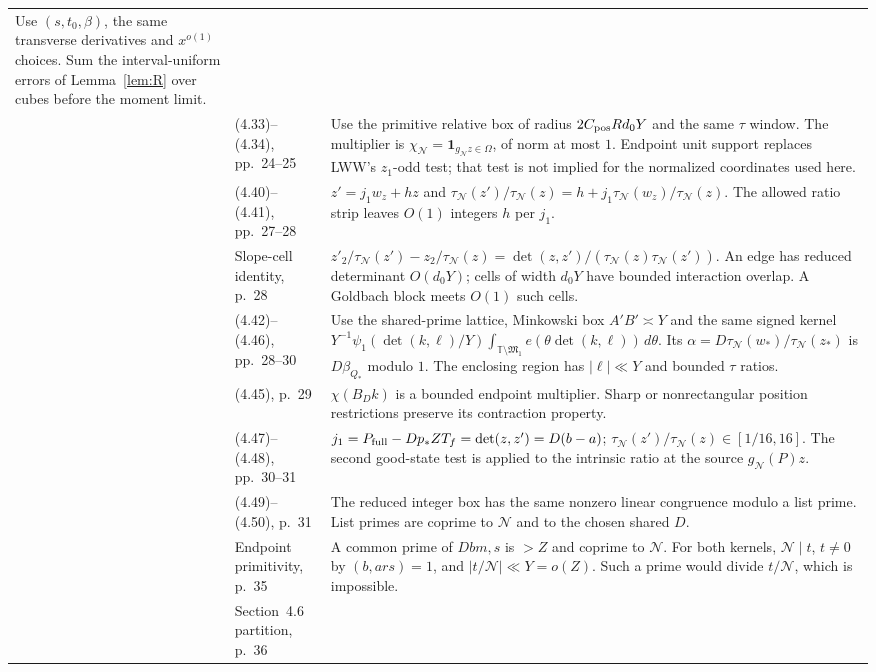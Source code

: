 \documentclass[11pt]{article}
\theoremstyle{definition}
\newcommand{\ind}{\mathbf 1}
\newcommand{\GN}{\mathcal N}
\newcommand{\T}{\mathbb T}
\newcommand{\tauN}{\tau_{\GN}}
\newcommand{\gN}{g_{\GN}}
\newcommand{\Mone}{\mathfrak M_1}
\theoremstyle{remark}
\numberwithin{equation}{section}
\begin{document}
\begin{longtable}{@{}>{\raggedright\arraybackslash}p{}>{\raggedright\arraybackslash}p{}>{\raggedright\arraybackslash}p{}@{}}
Use $(s,t_0,\beta)$, the same transverse derivatives and
$x^{o(1)}$ choices. Sum the interval-uniform errors of Lemma~\ref{lem:R}
over cubes before the moment limit.\\
9\label{dict:09}&(4.33)--(4.34), pp.~24--25&
Use the primitive relative box of radius $2C_{\rm pos}Rd_0Y$
and the same $\tau$ window. The multiplier is
$\chi_{\GN}=\ind_{\gN z\in\Omega}$, of norm at most $1$.
Endpoint unit support replaces LWW's $z_1$-odd test;
that test is not implied for the normalized coordinates used here.\\
10\label{dict:10}&(4.40)--(4.41), pp.~27--28&
$z'=j_1w_z+hz$ and
$\tauN(z')/\tauN(z)=h+j_1\tauN(w_z)/\tauN(z)$.
The allowed ratio strip leaves $O(1)$ integers $h$ per $j_1$.\\
11\label{dict:11}&Slope-cell identity, p.~28&
$z'_2/\tauN(z')-z_2/\tauN(z)=\det(z,z')/(\tauN(z)\tauN(z'))$.
An edge has reduced determinant $O(d_0Y)$; cells of width $d_0Y$
have bounded interaction overlap. A Goldbach block meets $O(1)$ such cells.\\
12\label{dict:12}&(4.42)--(4.46), pp.~28--30&
Use the shared-prime lattice, Minkowski box $A'B'\asymp Y$ and
the same signed kernel
$Y^{-1}\psi_1(\det(k,\ell)/Y)\int_{\T\setminus\Mone}e(\theta\det(k,\ell))\,d\theta$.
Its $\alpha=D\tauN(w_*)/\tauN(z_*)$ is $D\beta_{Q_*}$ modulo $1$.
The enclosing region has $|\ell|\ll Y$ and bounded $\tau$ ratios.\\
13\label{dict:13}&(4.45), p.~29&
$\chi(B_Dk)$ is a bounded endpoint multiplier. Sharp or nonrectangular
position restrictions preserve its contraction property.\\
14\label{dict:14}&(4.47)--(4.48), pp.~30--31&
$j_1=P_{\rm full}-Dp_*ZT_f=\det(z,z')=D(b-a)$;
$\tauN(z')/\tauN(z)\in[1/16,16]$.
The second good-state test is applied to the intrinsic ratio at
the source $g_{\GN}(P)z$.\\
15\label{dict:15}&(4.49)--(4.50), p.~31&
The reduced integer box has the same nonzero linear congruence modulo
a list prime. List primes are coprime to $\GN$ and to the chosen shared $D$.\\
16\label{dict:16}&Endpoint primitivity, p.~35&
A common prime of $Dbm,s$ is $>Z$ and coprime to $\GN$.
For both kernels, $\GN\mid t$, $t\ne0$ by $(b,ars)=1$, and
$|t/\GN|\ll Y=o(Z)$. Such a prime would divide $t/\GN$,
which is impossible.\\
17\label{dict:17}&Section~4.6 partition, p.~36&

\end{longtable}
\end{document}
